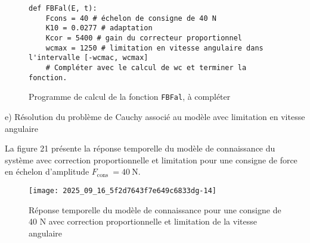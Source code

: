 \ifprof
\begin{corrige}
\end{corrige}
\else
\fi




\begin{figure}[!h]
\begin{lstlisting}
def FBFal(E, t):
    Fcons = 40 # échelon de consigne de 40 N
    K10 = 0.0277 # adaptation
    Kcor = 5400 # gain du correcteur proportionnel
    wcmax = 1250 # limitation en vitesse angulaire dans l'intervalle [-wcmac, wcmax]
    # Compléter avec le calcul de wc et terminer la fonction.
\end{lstlisting}

\caption{\label{ccs_mp_2023_fig_20}  Programme de calcul de la fonction \lstinline{FBFal}, à compléter}
\end{figure}


e) Résolution du problème de Cauchy associé au modèle avec limitation en vitesse angulaire

La figure 21 présente la réponse temporelle du modèle de connaissance du système avec correction proportionnelle et limitation pour une consigne de force en échelon d'amplitude $F_{\text {cons }}=40 \mathrm{~N}$.


\begin{figure}[!h]
\centering
\texttt{[image: 2025\_09\_16\_5f2d7643f7e649c6833dg-14]}
\caption{\label{ccs_mp_2023_fig_21}  Réponse temporelle du modèle de connaissance pour une consigne de 40 N avec correction proportionnelle et limitation de la vitesse angulaire}
\end{figure}



\ifprof
\begin{corrige}
\end{corrige}
\else
\fi



